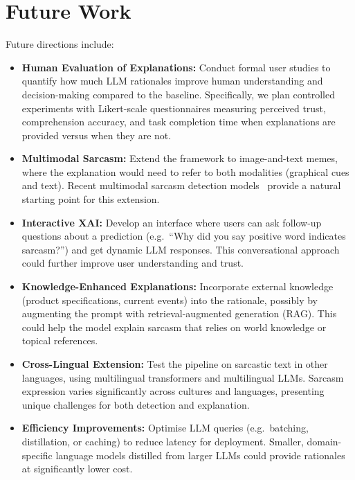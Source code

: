 
\section{Future Work}\label{sec:future_work}

Future directions include:

\begin{itemize}[leftmargin=*]
    \item \textbf{Human Evaluation of Explanations:} Conduct formal user studies to quantify how much LLM rationales improve human understanding and decision-making compared to the baseline. Specifically, we plan controlled experiments with Likert-scale questionnaires measuring perceived trust, comprehension accuracy, and task completion time when explanations are provided versus when they are not.

    \item \textbf{Multimodal Sarcasm:} Extend the framework to image-and-text memes, where the explanation would need to refer to both modalities (graphical cues and text). Recent multimodal sarcasm detection models~\cite{yao2023m3n2} provide a natural starting point for this extension.

    \item \textbf{Interactive XAI:} Develop an interface where users can ask follow-up questions about a prediction (e.g.\ ``Why did you say positive word indicates sarcasm?'') and get dynamic LLM responses. This conversational approach could further improve user understanding and trust.

    \item \textbf{Knowledge-Enhanced Explanations:} Incorporate external knowledge (product specifications, current events) into the rationale, possibly by augmenting the prompt with retrieval-augmented generation (RAG). This could help the model explain sarcasm that relies on world knowledge or topical references.

    \item \textbf{Cross-Lingual Extension:} Test the pipeline on sarcastic text in other languages, using multilingual transformers and multilingual LLMs. Sarcasm expression varies significantly across cultures and languages, presenting unique challenges for both detection and explanation.

    \item \textbf{Efficiency Improvements:} Optimise LLM queries (e.g.\ batching, distillation, or caching) to reduce latency for deployment. Smaller, domain-specific language models distilled from larger LLMs could provide rationales at significantly lower cost.


\end{itemize}
